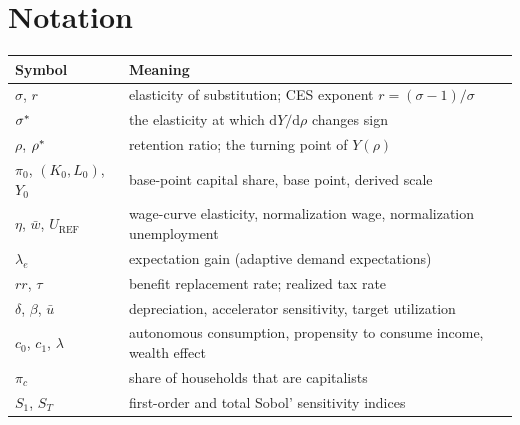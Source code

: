 
\section{Notation}
\label{app:notation}

\begin{table}[H]
\centering
\small
\begin{tabularx}{\textwidth}{lX}
\toprule
Symbol & Meaning\\
\midrule
$\sigma$, $r$ & elasticity of substitution; CES exponent $r = (\sigma-1)/\sigma$\\
$\sigma^{\ast}$ & the elasticity at which $\mathrm{d}Y/\mathrm{d}\rho$ changes sign\\
$\rho$, $\rho^{\ast}$ & retention ratio; the turning point of $Y(\rho)$\\
$\pi_0$, $(K_0,L_0)$, $Y_0$ & base-point capital share, base point, derived scale\\
$\eta$, $\bar w$, $U_{\mathrm{REF}}$ & wage-curve elasticity, normalization wage, normalization unemployment\\
$\lambda_e$ & expectation gain (adaptive demand expectations)\\
$rr$, $\tau$ & benefit replacement rate; realized tax rate\\
$\delta$, $\beta$, $\bar u$ & depreciation, accelerator sensitivity, target utilization\\
$c_0$, $c_1$, $\lambda$ & autonomous consumption, propensity to consume income, wealth effect\\
$\pi_c$ & share of households that are capitalists\\
$S_1$, $S_T$ & first-order and total Sobol' sensitivity indices\\
\bottomrule
\end{tabularx}
\end{table}
